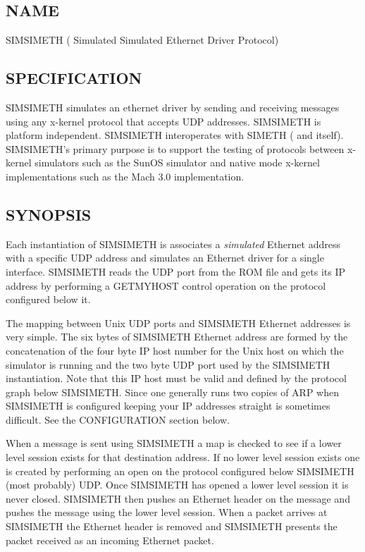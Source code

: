 %
%
%

\subsection*{NAME}

\noindent SIMSIMETH ( Simulated Simulated Ethernet Driver Protocol)

\subsection*{SPECIFICATION}

\noindent
SIMSIMETH simulates an \xk{} ethernet driver by sending and receiving
messages using any x-kernel protocol that accepts UDP addresses. SIMSIMETH is platform independent. SIMSIMETH interoperates with SIMETH
( and itself). SIMSIMETH's primary purpose is to support the testing of 
protocols between x-kernel simulators such as the SunOS simulator 
and native mode x-kernel implementations such as the Mach 3.0 implementation. 


\subsection*{SYNOPSIS}

\noindent 
Each instantiation of SIMSIMETH is associates a {\em simulated} 
Ethernet address with a specific UDP address and simulates an 
Ethernet driver for a single interface.  
SIMSIMETH reads the UDP port from the ROM file and gets its IP
address by performing a GETMYHOST control operation on 
the protocol configured below it. 

The mapping between Unix UDP ports and SIMSIMETH Ethernet addresses is
very simple.  The six bytes of SIMSIMETH Ethernet address are formed by
the concatenation of the four byte IP host number for the Unix host on
which the simulator is running and the two byte UDP port used
by the SIMSIMETH instantiation.  Note that this IP host must be 
valid and defined by the protocol graph below SIMSIMETH. Since one 
generally runs two copies of ARP when SIMSIMETH is configured
keeping your  IP addresses straight is sometimes difficult. 
See the CONFIGURATION section below.

When a message is sent using SIMSIMETH a map is checked to see 
if a lower level session exists for that destination address. 
If no lower level  session exists one is created by performing an  
open on the protocol  configured below SIMSIMETH (most probably) UDP. 
Once SIMSIMETH has opened a lower level session it is never closed. 
SIMSIMETH then pushes an Ethernet header on the message 
and pushes the message using the lower level session.
When a packet arrives at SIMSIMETH the Ethernet header is removed 
and SIMSIMETH presents the packet received  as 
an incoming Ethernet packet.


